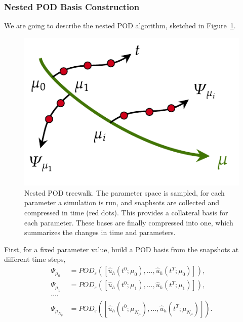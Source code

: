 \documentclass[../../thesis.tex]{subfiles}
\begin{document}

\subsubsection{Nested POD Basis Construction}
\label{sec:1d_rom_burgers_basis_construction_nested}
We are going to describe the nested POD algorithm, 
sketched in Figure~\ref{fig:treewalk_sketch}.
\begin{figure}[h]
    \centering
    \includegraphics[width=0.8\columnwidth]{research_project/piston/figures/treewalk.pdf}
    \caption{Nested POD treewalk.
    The parameter space is sampled, for each parameter a simulation is run,
    and snaphsots are collected and compressed in time (red dots).
    This provides a collateral basis for each parameter.
    These bases are finally compressed into one, 
    which summarizes the changes in time and parameters.}
    \label{fig:treewalk_sketch}
\end{figure}
First, for a fixed parameter value, build a POD basis from the snapshots at different time steps,
\begin{align*}
    \Psi_{\mu_0} &= POD_{\varepsilon}\left(\left[\hat{u}_h(t^0; \mu_0), \ldots, \hat{u}_h(t^T; \mu_0)\right]\right), \\
    \Psi_{\mu_1} &= POD_{\varepsilon}\left(\left[\hat{u}_h(t^0; \mu_1), \ldots, \hat{u}_h(t^T; \mu_1)\right]\right), \\  
    \ldots, \\
    \Psi_{\mu_{N_{\mu}}} &= POD_{\varepsilon}\left(\left[\hat{u}_h(t^0; \mu_{N_{\mu}}), \ldots, \hat{u}_h(t^T; \mu_{N_{\mu}})\right]\right).
\end{align*}
\end{document}
